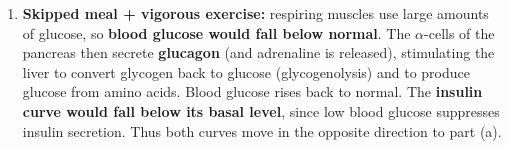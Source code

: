 \documentclass[11pt]{article}
\begin{document}
\begin{corrige}
\begin{enumerate}
\begin{itemize}
\item \textbf{Result and feedback:} blood glucose falls back to the set point; the fall is detected by the pancreas, which reduces insulin secretion — the response switches itself off, which is the essence of negative feedback.
\end{itemize}
\item \textbf{Skipped meal + vigorous exercise:} respiring muscles use large amounts of glucose, so \textbf{blood glucose would fall below normal}. The $\alpha$-cells of the pancreas then secrete \textbf{glucagon} (and adrenaline is released), stimulating the liver to convert glycogen back to glucose (glycogenolysis) and to produce glucose from amino acids. Blood glucose rises back to normal. The \textbf{insulin curve would fall below its basal level}, since low blood glucose suppresses insulin secretion. Thus both curves move in the opposite direction to part (a).
\end{enumerate}
\end{corrige}
\end{document}
